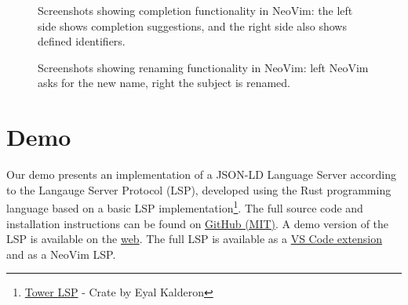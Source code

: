 \documentclass[
]{ceurart}
\begin{document}
\begin{figure}
\centering
{}
\caption{Screenshots showing completion functionality in NeoVim: the left side shows completion suggestions, and the right side also shows defined identifiers.}
\label{fig:complete}
\end{figure}


\begin{figure}
\centering
{}
\caption{Screenshots showing renaming functionality in NeoVim: left NeoVim asks for the new name, right the subject is renamed.}
\label{fig:rename}
\end{figure}


\section{Demo}

Our demo presents an implementation of a JSON-LD Language Server according to the Langauge Server Protocol (LSP), developed using the Rust programming language based on a basic LSP implementation\footnote{\href{https://crates.io/crates/tower-lsp}{Tower LSP} - Crate by Eyal Kalderon}.
The full source code and installation instructions can be found on \href{https://github.com/ajuvercr/jsonld-lsp}{GitHub (MIT)}.
A demo version of the LSP is available on the \href{https://ajuvercr.github.io/jsonld-lsp/}{web}.
The full LSP is available as a \href{https://marketplace.visualstudio.com/items?itemName=ajuvercr.jsonld-lsp}{VS Code extension} and as a NeoVim LSP.
\end{document}
